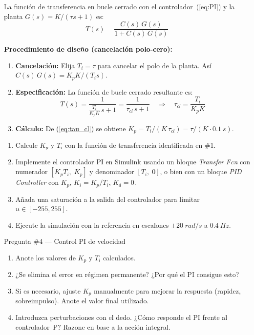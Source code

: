 \documentclass[12pt,a4paper]{article}
\begin{document}
La función de transferencia en bucle cerrado con el controlador~(\ref{eq:PI}) y la
planta $G(s)=K/(\tau s+1)$ es:
\begin{equation}
  T(s) = \frac{C(s)\,G(s)}{1+C(s)\,G(s)}
\end{equation}

\textbf{Procedimiento de diseño (cancelación polo-cero):}

\begin{enumerate}
  \item \textbf{Cancelación:} Elija $T_i = \tau$ para cancelar el polo de la planta.
        Así $C(s)\,G(s) = K_p K / (T_i s)$.
  \item \textbf{Especificación:} La función de bucle cerrado resultante es:
        \begin{equation}
          T(s) = \frac{1}{\frac{T_i}{K_p K}\,s + 1}
          = \frac{1}{\tau_{cl}\,s+1}
          \quad\Rightarrow\quad
          \tau_{cl} = \frac{T_i}{K_p K}
          \label{eq:tau_cl}
        \end{equation}
  \item \textbf{Cálculo:} De (\ref{eq:tau_cl}) se obtiene
        $K_p = T_i / (K\,\tau_{cl}) = \tau / (K \cdot \SI{0.1}{s})$.
\end{enumerate}

\begin{enumerate}
  \item Calcule $K_p$ y $T_i$ con la función de transferencia identificada en \#1.
  \item Implemente el controlador PI en Simulink usando un bloque \emph{Transfer Fcn}
        con numerador $[K_p T_i,\;K_p]$ y denominador $[T_i,\;0]$,
        o bien con un bloque \emph{PID Controller} con $K_p$, $K_i=K_p/T_i$, $K_d=0$.
  \item Añada una saturación a la salida del controlador para limitar $u\in[-255,255]$.
  \item Ejecute la simulación con la referencia en escalones $\pm 20\;\si{rad/s}$
        a $\SI{0.4}{Hz}$.
\end{enumerate}

\begin{pregunta}{Pregunta \#4 — Control PI de velocidad}
  \begin{enumerate}[label=\alph*)]
    \item Anote los valores de $K_p$ y $T_i$ calculados.
    \item ¿Se elimina el error en régimen permanente? ¿Por qué el PI consigue esto?
    \item Si es necesario, ajuste $K_p$ manualmente para mejorar la respuesta
          (rapidez, sobreimpulso). Anote el valor final utilizado.
    \item Introduzca perturbaciones con el dedo. ¿Cómo responde el PI
          frente al controlador~P? Razone en base a la acción integral.
  \end{enumerate}
\end{pregunta}
\end{document}
